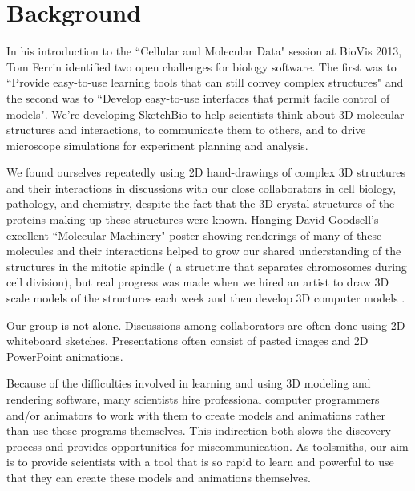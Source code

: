 \documentclass[twocolumn]{bmcart}%
\begin{document}


\section*{Background}

In his introduction to the ``Cellular and Molecular Data" session at BioVis 2013, Tom Ferrin identified two open challenges for biology software.
The first was to ``Provide easy-to-use learning tools that can still convey complex structures" and the second was to ``Develop easy-to-use interfaces that permit facile control of models".
We’re developing SketchBio to help scientists think about 3D molecular structures and interactions, to communicate them to others, and to drive microscope simulations for experiment planning and analysis.

We found ourselves repeatedly using 2D hand-drawings of complex 3D structures and their interactions in discussions with our close collaborators in cell biology, pathology, and chemistry, despite the fact that the 3D crystal structures of the proteins making up these structures were known.
Hanging David Goodsell's excellent ``Molecular Machinery" poster \cite{Goodsell} showing renderings of many of these molecules and their interactions helped to grow our shared understanding of the structures in the mitotic spindle ( a structure that separates chromosomes during cell division), but real progress was made when we hired an artist to draw 3D scale models of the structures each week and then develop 3D computer models \cite{taylor2012}.

Our group is not alone.  Discussions among collaborators are often done using 2D whiteboard sketches.  Presentations often consist of pasted images and 2D PowerPoint animations.

Because of the difficulties involved in learning and using 3D modeling and rendering software, many scientists hire professional computer programmers and/or animators to work with them to create models and animations rather than use these programs themselves.
This indirection both slows the discovery process and provides opportunities for miscommunication.
As toolsmiths, our aim is to provide scientists with a tool that is so rapid to learn and powerful to use that they can create these models and animations themselves.
\end{document}

